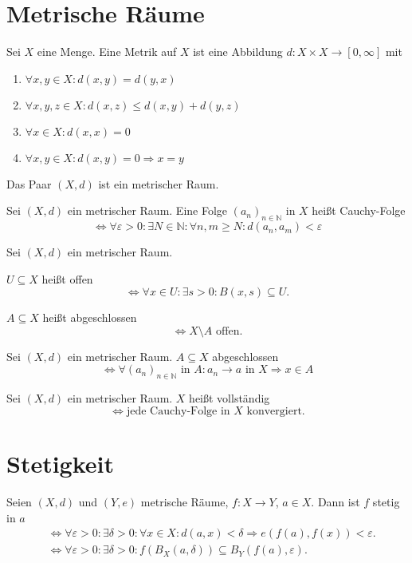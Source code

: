 \documentclass[]{scrartcl}
\newcommand{\N}{\ensuremath{\mathbb{N}}}
\begin{document}
\section*{Metrische R\"aume}
\begin{definition}
Sei $X$ eine Menge. Eine Metrik auf $X$ ist eine Abbildung $d:X\times X\to\left[0,\infty\right]$ mit
\begin{enumerate}
\item $\forall x,y\in X:d(x,y)=d(y,x)$
\item $\forall x,y,z\in X:d(x,z)\leq d(x,y)+d(y,z)$
\item $\forall x\in X:d(x,x)=0$
\item $\forall x,y\in X:d(x,y)=0\Rightarrow x=y$
\end{enumerate}
Das Paar $(X,d)$ ist ein metrischer Raum.
\end{definition}

\begin{definition}
Sei $(X,d)$ ein metrischer Raum. Eine Folge $(a_n)_{n\in\N}$ in $X$ hei\ss t Cauchy-Folge
\[\Leftrightarrow\forall\varepsilon>0:\exists N\in\N:\forall n,m\geq N:d(a_n,a_m)<\varepsilon\]
\end{definition}

\begin{definition}
Sei $(X,d)$ ein metrischer Raum.

$U\subseteq X$ hei\ss t offen
\[\Leftrightarrow\forall x\in U:\exists s>0:B(x,s)\subseteq U.\]

$A\subseteq X$ hei\ss t abgeschlossen \[\Leftrightarrow X\setminus A\text{ offen.}\]
\end{definition}

\begin{satz}
Sei $(X,d)$ ein metrischer Raum. $A\subseteq X$ abgeschlossen
\[\Leftrightarrow\forall (a_n)_{n\in\N}\text{ in }A:a_n\to a\text{ in }X\Rightarrow x\in A\]
\end{satz}

\begin{definition}
Sei $(X,d)$ ein metrischer Raum. $X$ hei\ss t vollst\"andig
\[\Leftrightarrow\text{jede Cauchy-Folge in $X$ konvergiert.}\]
\end{definition}

\section*{Stetigkeit}
\begin{definition}[Stetigkeit]
Seien $(X,d)$ und $(Y,e)$ metrische R\"aume, $f:X\to Y$, $a\in X$. Dann ist $f$ stetig in $a$
\begin{align*}
&\Leftrightarrow\forall\varepsilon>0:\exists\delta>0:\forall x\in X:d(a,x)<\delta\Rightarrow e(f(a),f(x))<\varepsilon.\\
&\Leftrightarrow\forall\varepsilon>0:\exists\delta>0:f(B_X(a,\delta))\subseteq B_Y(f(a),\varepsilon).
\end{align*}
\end{definition}
\end{document}
